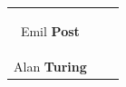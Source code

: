 \documentclass[a4paper,parskip=half*,DIV=7,fontsize=11pt]{scrartcl}
\begin{document}
\begin{adjustbox}{center}
\begin{tabular}{ccc}
{\begin{center}
	Emil \textbf{Post}
	\end{center}
} &
\parbox[t]{5cm}{
	\begin{center}
\includegraphics[height=3cm]{img/turing.jpg}\\
	Alan \textbf{Turing}
	\end{center}
}   
\end{tabular}
\end{adjustbox}
\end{document}

